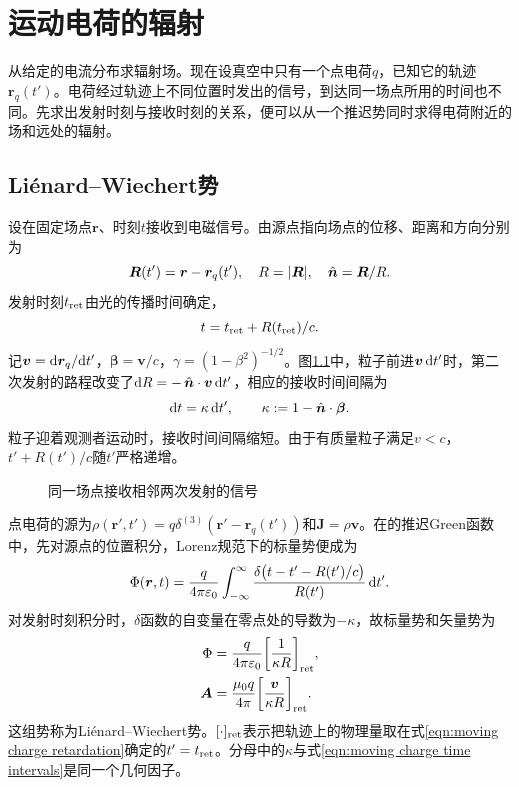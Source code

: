\chapter{运动电荷的辐射}
\label{chap:raidiation by moving charge}

从给定的电流分布求辐射场。现在设真空中只有一个点电荷$q$，已知它的轨迹$\bm r_q(t')$。电荷经过轨迹上不同位置时发出的信号，到达同一场点所用的时间也不同。先求出发射时刻与接收时刻的关系，便可以从一个推迟势同时求得电荷附近的场和远处的辐射。

\section{Li\'enard--Wiechert势}

设在固定场点$\bm r$、时刻$t$接收到电磁信号。由源点指向场点的位移、距离和方向分别为
\[
    \bm R(t') = \bm r - \bm r_q(t'),\quad R = \lvert\bm R\rvert,\quad \mathop{}\!\hat{\bm{n}} = \bm R/R.
\]
发射时刻$t_{\mathrm{ret}}$由光的传播时间确定，
\begin{equation}
    t = t_{\mathrm{ret}} + R(t_{\mathrm{ret}})/c.
    \label{eqn:moving charge retardation}
\end{equation}
记$\bm v = \mathop{}\!\mathrm{d}\bm r_q/\mathrm{d} t'$，$\bm\beta = \bm v/c$，$\gamma = (1 - \beta^2)^{-1/2}$。图\ref{fig:moving-charge-retardation}中，粒子前进$\bm v\mathop{}\!\mathrm{d} t'$时，第二次发射的路程改变了$\mathop{}\!\mathrm{d} R = -\mathop{}\!\hat{\bm{n}} \cdot \bm v\mathop{}\!\mathrm{d} t'$，相应的接收时间间隔为
\begin{equation}
    \mathop{}\!\mathrm{d} t = \kappa\mathop{}\!\mathrm{d} t',\qquad \kappa := 1 - \mathop{}\!\hat{\bm{n}} \cdot \bm\beta.
    \label{eqn:moving charge time intervals}
\end{equation}
粒子迎着观测者运动时，接收时间间隔缩短。由于有质量粒子满足$v < c$，$t' + R(t')/c$随$t'$严格递增。

\begin{figure}[htbp]
    \centering
    \caption{同一场点接收相邻两次发射的信号}
    \label{fig:moving-charge-retardation}
\end{figure}

点电荷的源为$\rho(\bm r',t') = q\delta^{(3)}(\bm r' - \bm r_q(t'))$和$\bm J = \rho\bm v$。在的推迟Green函数中，先对源点的位置积分，Lorenz规范下的标量势便成为
\[
    \Phi(\bm r,t) = \frac{q}{4\pi\varepsilon_0}\int_{-\infty}^\infty
    \frac{\delta\bigl(t - t' - R(t')/c\bigr)}{R(t')}\mathop{}\!\mathrm{d} t'.
\]
对发射时刻积分时，$\delta$函数的自变量在零点处的导数为$-\kappa$，故标量势和矢量势为
\begin{subequations}\label{eqn:moving charge potentials}
    \begin{align}
        \Phi &= \frac{q}{4\pi\varepsilon_0}\biggl[\frac1{\kappa R}\biggr]_{\mathrm{ret}},\\
        \bm A &= \frac{\mu_0q}{4\pi}\biggl[\frac{\bm v}{\kappa R}\biggr]_{\mathrm{ret}}.
    \end{align}
\end{subequations}
这组势称为Li\'enard--Wiechert势。$[\cdot]_{\mathrm{ret}}$表示把轨迹上的物理量取在式\eqref{eqn:moving charge retardation}确定的$t' = t_{\mathrm{ret}}$。分母中的$\kappa$与式\eqref{eqn:moving charge time intervals}是同一个几何因子。

